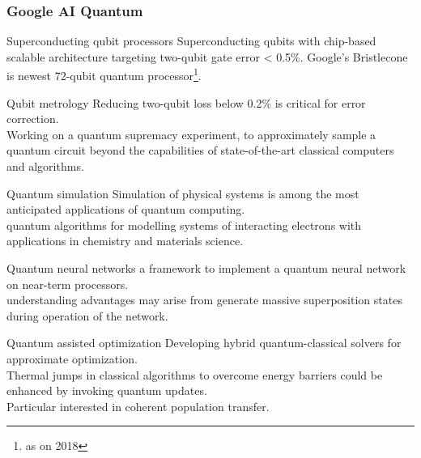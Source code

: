 \documentclass[xcolor=x11names,table]{beamer}
\begin{document}
\begin{frame}[allowframebreaks]
\frametitle{Google AI Quantum}
	\begin{block}{Superconducting qubit processors}
		Superconducting qubits with chip-based scalable architecture targeting two-qubit gate error < 0.5\%. Google's Bristlecone is newest 72-qubit quantum processor\footnote{as on 2018}.
	\end{block}
	\begin{block}{Qubit metrology}
		Reducing two-qubit loss below 0.2\% is critical for error correction.
		\\ Working on a quantum supremacy experiment, to approximately sample a quantum circuit beyond the capabilities of state-of-the-art classical computers and algorithms.
	\end{block}
	\begin{block}{Quantum simulation}
		Simulation of physical systems is among the most anticipated applications of quantum computing.
		\\ quantum algorithms for modelling systems of interacting electrons with applications in chemistry and materials science.
	\end{block}
	\begin{block}{Quantum neural networks}
		a framework to implement a quantum neural network on near-term processors.
		\\ understanding advantages may arise from generate massive superposition states during operation of the network.
	\end{block}
	\begin{block}{Quantum assisted optimization}
		Developing hybrid quantum-classical solvers for approximate optimization.
		\\ Thermal jumps in classical algorithms to overcome energy barriers could be enhanced by invoking quantum updates.
		\\ Particular interested in coherent population transfer.
	\end{block}
\end{frame}

\end{document}
